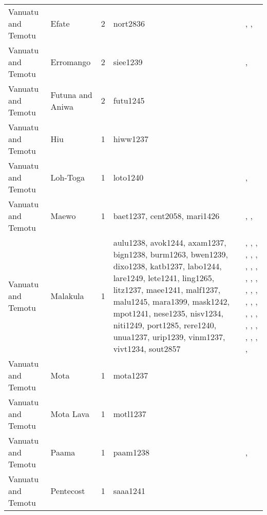 \begin{longtable}{p{3cm}p{3cm}p{2cm}p{2cm}p{4cm}}
  Vanuatu and Temotu & Efate & 2 & nort2836 & \citet{facey1981hereditary}, \citet{facey1981hereditary}, \citet{facey1981hereditary} \\ 
  Vanuatu and Temotu & Erromango & 2 & siee1239 & \citet{humphreys1926}, \citet{spriggs1989archaeological} \\ 
  Vanuatu and Temotu & Futuna and Aniwa & 2 & futu1245 & \citet{capell1958culture} \\ 
  Vanuatu and Temotu & Hiu & 1 & hiww1237 & \citet{bonnemaison1996power} \\ 
  Vanuatu and Temotu & Loh-Toga & 1 & loto1240 & \citet{bonnemaison1996power}, \citet{bonnemaison1996power} \\ 
  Vanuatu and Temotu & Maewo & 1 & baet1237, cent2058, mari1426 & \citet{bonnemaison1996power}, \citet{bonnemaison1996power}, \citet{bonnemaison1996power} \\ 
  Vanuatu and Temotu & Malakula & 1 & aulu1238, avok1244, axam1237, bign1238, burm1263, bwen1239, dixo1238, katb1237, labo1244, lare1249, lete1241, ling1265, litz1237, maee1241, malf1237, malu1245, mara1399, mask1242, mpot1241, nese1235, nisv1234, niti1249, port1285, rere1240, unua1237, urip1239, vinm1237, vivt1234, sout2857 & \citet{bonnemaison1996power}, \citet{bonnemaison1996power}, \citet{bonnemaison1996power}, \citet{bonnemaison1996power}, \citet{bonnemaison1996power}, \citet{bonnemaison1996power}, \citet{bonnemaison1996power}, \citet{bonnemaison1996power}, \citet{bonnemaison1996power}, \citet{bonnemaison1996power}, \citet{bonnemaison1996power}, \citet{bonnemaison1996power}, \citet{bonnemaison1996power}, \citet{bonnemaison1996power}, \citet{bonnemaison1996power}, \citet{bonnemaison1996power}, \citet{bonnemaison1996power}, \citet{bonnemaison1996power}, \citet{bonnemaison1996power}, \citet{bonnemaison1996power}, \citet{bonnemaison1996power}, \citet{bonnemaison1996power}, \citet{bonnemaison1996power}, \citet{bonnemaison1996power}, \citet{bonnemaison1996power}, \citet{bonnemaison1996power}, \citet{bonnemaison1996power}, \citet{bonnemaison1996power}, \citet{deacon1934} \\ 
  Vanuatu and Temotu & Mota & 1 & mota1237 & \citet{bonnemaison1996power} \\ 
  Vanuatu and Temotu & Mota Lava & 1 & motl1237 & \citet{bonnemaison1996power} \\ 
  Vanuatu and Temotu & Paama & 1 & paam1238 & \citet{bonnemaison1996power}, \citet{bonnemaison1996power} \\ 
  Vanuatu and Temotu & Pentecost & 1 & saaa1241 & \citet{lane1956} \\ 

\end{longtable}
